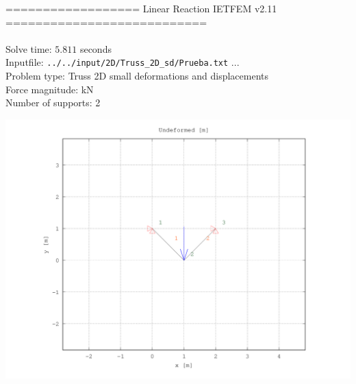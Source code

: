\documentclass[a4paper,11pt]{article}
\begin{document}

================== Linear Reaction IETFEM v2.11 ===========================\\\\


Solve time: $ 5.811$ seconds \\

Inputfile: \verb|../../input/2D/Truss_2D_sd/Prueba.txt|  ... \\

Problem type: Truss 2D small deformations and displacements\\ 

Force magnitude: kN \\

 Number of supports: 2 \\

\newpage       

\begin{center}       
\includegraphics[width=.80\textwidth]{../../Prueba_undeformed.png}    
  \end{center}       
\end{document}
